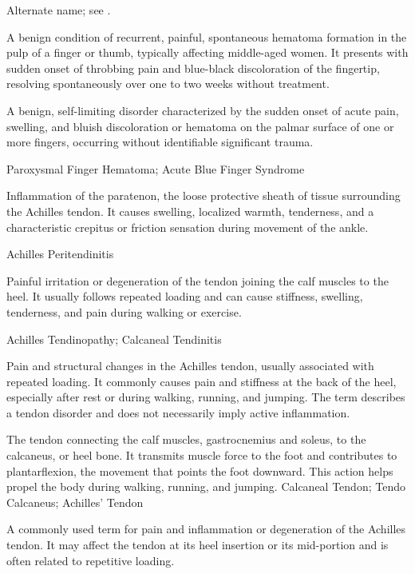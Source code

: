  Alternate name; see .

 A benign condition of recurrent, painful, spontaneous hematoma formation in the pulp of
a finger or thumb, typically affecting middle-aged women. It presents with sudden onset
of throbbing pain and blue-black discoloration of the fingertip, resolving spontaneously
over one to two weeks without treatment.

 A benign, self-limiting disorder characterized by the sudden onset of acute pain, swelling, and bluish discoloration or hematoma on the palmar surface of one or more fingers, occurring without identifiable significant trauma.

\synonyms
Paroxysmal Finger Hematoma; Acute Blue Finger Syndrome

 Inflammation of the paratenon, the loose protective sheath of tissue surrounding the Achilles tendon. It causes swelling, localized warmth, tenderness, and a characteristic crepitus or friction sensation during movement of the ankle.

\synonyms
Achilles Peritendinitis

 Painful irritation or degeneration of the tendon joining the calf muscles to the heel. It usually follows repeated loading and can cause stiffness, swelling, tenderness, and pain during walking or exercise.

\synonyms
Achilles Tendinopathy; Calcaneal Tendinitis

 Pain and structural changes in the Achilles tendon, usually
associated with repeated loading. It commonly causes pain and stiffness at the back of the
heel, especially after rest or during walking, running, and jumping. The term describes a
tendon disorder and does not necessarily imply active inflammation.

 The tendon connecting the calf muscles, gastrocnemius and soleus, to the calcaneus, or
heel bone. It transmits muscle force to the foot and contributes to plantarflexion, the movement that points the
foot downward. This action helps propel the body during walking, running, and jumping.
\synonyms
Calcaneal Tendon; Tendo Calcaneus; Achilles' Tendon

 A commonly used term for pain and inflammation or degeneration of the Achilles tendon. It may affect the tendon
at its heel insertion or its mid-portion and is often related to repetitive loading.


